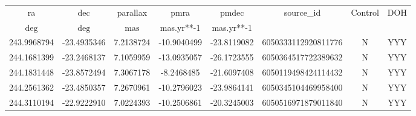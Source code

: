 \begin{table}
\begin{tabular}{cccccccc}
ra & dec & parallax & pmra & pmdec & source_id & Control & DOH \\
$\mathrm{deg}$ & $\mathrm{deg}$ & $\mathrm{mas}$ & mas.yr**-1 & mas.yr**-1 &  &  &  \\
243.9968794 & -23.4935346 & 7.2138724 & -10.9040499 & -23.8119082 & 6050333112920811776 & N & YYY \\
244.1681399 & -23.2468137 & 7.1059959 & -13.0935057 & -26.1723555 & 6050364517722389632 & N & YYY \\
244.1831448 & -23.8572494 & 7.3067178 & -8.2468485 & -21.6097408 & 6050119498424114432 & N & YYY \\
244.2561362 & -23.4850357 & 7.2670961 & -10.2796023 & -23.9864141 & 6050345104469958400 & N & YYY \\
244.3110194 & -22.9222910 & 7.0224393 & -10.2506861 & -20.3245003 & 6050516971879011840 & N & YYY \\
\end{tabular}
\end{table}
